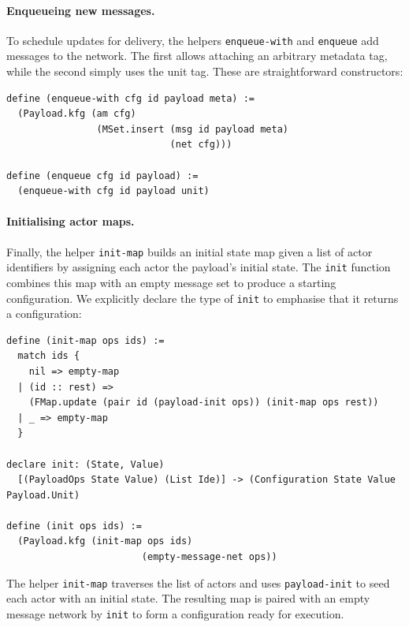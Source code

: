 \paragraph{Enqueueing new messages.}  To schedule updates for delivery, the helpers \lstinline{enqueue-with} and \lstinline{enqueue} add messages to the network.  The first allows attaching an arbitrary metadata tag, while the second simply uses the unit tag.  These are straightforward constructors:

\begin{lstlisting}[language=Athena,style=athena]
define (enqueue-with cfg id payload meta) :=
  (Payload.kfg (am cfg)
                (MSet.insert (msg id payload meta)
                             (net cfg)))

define (enqueue cfg id payload) :=
  (enqueue-with cfg id payload unit)
\end{lstlisting}

\paragraph{Initialising actor maps.}  Finally, the helper \lstinline{init-map} builds an initial state map given a list of actor identifiers by assigning each actor the payload’s initial state.  The \lstinline{init} function combines this map with an empty message set to produce a starting configuration.  We explicitly declare the type of \lstinline{init} to emphasise that it returns a configuration:

\begin{lstlisting}[language=Athena,style=athena]
define (init-map ops ids) :=
  match ids {
    nil => empty-map
  | (id :: rest) =>
    (FMap.update (pair id (payload-init ops)) (init-map ops rest))
  | _ => empty-map
  }

declare init: (State, Value)
  [(PayloadOps State Value) (List Ide)] -> (Configuration State Value Payload.Unit)

define (init ops ids) :=
  (Payload.kfg (init-map ops ids)
                        (empty-message-net ops))
\end{lstlisting}

The helper \lstinline{init-map} traverses the list of actors and uses \lstinline{payload-init} to seed each actor with an initial state.  The resulting map is paired with an empty message network by \lstinline{init} to form a configuration ready for execution.

